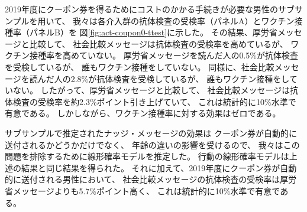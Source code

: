 \documentclass[
  11pt,
  a4paper,
]{article}
\begin{document}
2019年度にクーポン券を得るためにコストのかかる手続きが必要な男性のサブサンプルを用いて、
我々は各介入群の抗体検査の受検率（パネルA）とワクチン接種率（パネルB）を
図\ref{fig:act-coupon0-ttest}に示した。
その結果、厚労省メッセージと比較して、
社会比較メッセージは抗体検査の受検率を高めているが、
ワクチン接種率を高めていない。
厚労省メッセージを読んだ人の0.5\%が抗体検査を受検しているが、
誰もワクチン接種をしていない。
同様に、社会比較メッセージを読んだ人の2.8\%が抗体検査を受検しているが、
誰もワクチン接種をしていない。
したがって、厚労省メッセージと比較して、
社会比較メッセージは抗体検査の受検率を約2.3\%ポイント引き上げていて、
これは統計的に10\%水準で有意である。
しかしながら、ワクチン接種率に対する効果はゼロである。

サブサンプルで推定されたナッジ・メッセージの効果は
クーポン券が自動的に送付されるかどうかだけでなく、
年齢の違いの影響を受けるので、
我々はこの問題を排除するために線形確率モデルを推定した。
行動の線形確率モデルは上述の結果と同じ結果を得られた。
それに加えて、2019年度にクーポン券が自動的に送付される男性において、
社会比較メッセージの抗体検査の受検率は厚労省メッセージよりも5.7\%ポイント高く、
これは統計的に10\%水準で有意である。
\end{document}
